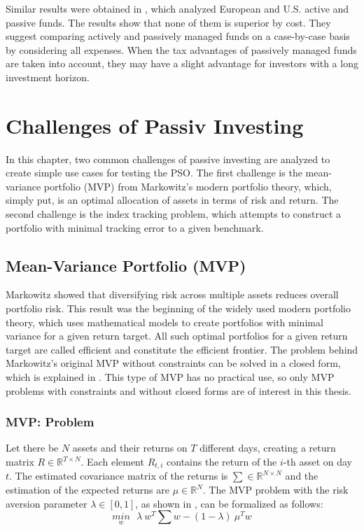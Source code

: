 \documentclass[
  oneside]{book}
\begin{document}
Similar results were obtained in \citep{PaHi2016}, which analyzed European and U.S. active and passive funds. The results show that none of them is superior by cost. They suggest comparing actively and passively managed funds on a case-by-case basis by considering all expenses. When the tax advantages of passively managed funds are taken into account, they may have a slight advantage for investors with a long investment horizon.

\hypertarget{challenges}{%
\chapter{Challenges of Passiv Investing}\label{challenges}}

In this chapter, two common challenges of passive investing are analyzed to create simple use cases for testing the PSO. The first challenge is the mean-variance portfolio (MVP) from Markowitz's modern portfolio theory, which, simply put, is an optimal allocation of assets in terms of risk and return. The second challenge is the index tracking problem, which attempts to construct a portfolio with minimal tracking error to a given benchmark.

\hypertarget{mean-variance-portfolio-mvp}{%
\section{Mean-Variance Portfolio (MVP)}\label{mean-variance-portfolio-mvp}}

Markowitz showed that diversifying risk across multiple assets reduces overall portfolio risk. This result was the beginning of the widely used modern portfolio theory, which uses mathematical models to create portfolios with minimal variance for a given return target. All such optimal portfolios for a given return target are called efficient and constitute the efficient frontier. The problem behind Markowitz's original MVP without constraints can be solved in a closed form, which is explained in \citep{Eric2021}. This type of MVP has no practical use, so only MVP problems with constraints and without closed forms are of interest in this thesis.

\hypertarget{mvp-problem}{%
\subsection{MVP: Problem}\label{mvp-problem}}

Let there be \(N\) assets and their returns on \(T\) different days, creating a return matrix \(R \in \mathbb{R}^{T \times N}\). Each element \(R_{t,i}\) contains the return of the \(i\)-th asset on day \(t\). The estimated covariance matrix of the returns is \(\textstyle\sum \in \mathbb{R}^{N \times N}\) and the estimation of the expected returns are \(\mu \in \mathbb{R}^{N}\). The MVP problem with the risk aversion parameter \(\lambda \in [0,1]\), as shown in \citep{Mari2005}, can be formalized as follows:
\begin{equation} 
\underset{w}{min} \ \ \ \lambda \ w^T \textstyle\sum w - (1-\lambda) \ \mu^T w
\label{eq:MVP}
\end{equation}
\end{document}
